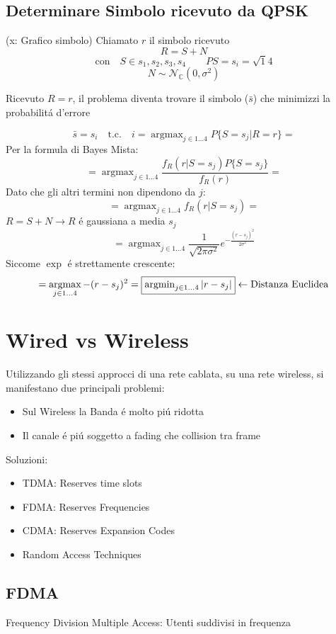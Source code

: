 \documentclass{article}
\DeclareMathOperator*{\argmax}{argmax}
\DeclareMathOperator*{\argmin}{argmin}
\begin{document}
\subsection{Determinare Simbolo ricevuto da QPSK}
(x: Grafico simbolo)
Chiamato $r$ il simbolo ricevuto
\[ R = S+N \]
\[ \text{con} \quad S \in {s_1, s_2, s_3, s_4 } \qquad P{S = s_i} = \sqrt{1}{4}\]
\[ N \sim \mathcal{N}_{\mathbb{C}}(0, \sigma^2)\]

Ricevuto $R=r$, il problema diventa trovare il simbolo ($\bar{s}$) che minimizzi la probabilit\'a d'errore

\[ \bar{s} = s_i \quad \text{t.c.} \quad i = \argmax_{j \in 1\ldots 4} P\{ S=s_j \big| R=r\}  = \]
Per la formula di Bayes Mista:
\[= \argmax_{j \in 1\ldots 4} \frac{f_R(r | S=s_j) P\{ S=s_j\}}{f_R(r)} =\]
Dato che gli altri termini non dipendono da $j$:
\[= \argmax_{j \in 1\ldots 4} f_R(r|S=s_j) =\]
$R = S+N \rightarrow R$ \'e gaussiana a media $s_j$
\[ = \argmax_{j \in 1\ldots 4} \frac{1}{\sqrt{2\pi\sigma^2}} e^{-\frac{(r - s_j)^2}{2\sigma^2}} \]
Siccome $\exp$ \'e strettamente crescente:
\[= \argmax_{j \in 1\ldots 4} -(r - s_j)^2 = \framebox{$\argmin_{j \in 1 \ldots 4} | r - s_j |$} \leftarrow\text{Distanza Euclidea}\]

\section{Wired vs Wireless}
Utilizzando gli stessi approcci di una rete cablata, su una rete wireless, si manifestano due principali problemi:
\begin{itemize}
    \item Sul Wireless la Banda \'e molto pi\'u ridotta
    \item Il canale \'e pi\'u soggetto a fading che collision tra frame
\end{itemize}

Soluzioni:
\begin{itemize}
    \item TDMA: Reserves time slots
    \item FDMA: Reserves Frequencies
    \item CDMA: Reserves Expansion Codes
    \item Random Access Techniques
\end{itemize}

\subsection{FDMA}
Frequency Division Multiple Access: Utenti suddivisi in frequenza
\end{document}
